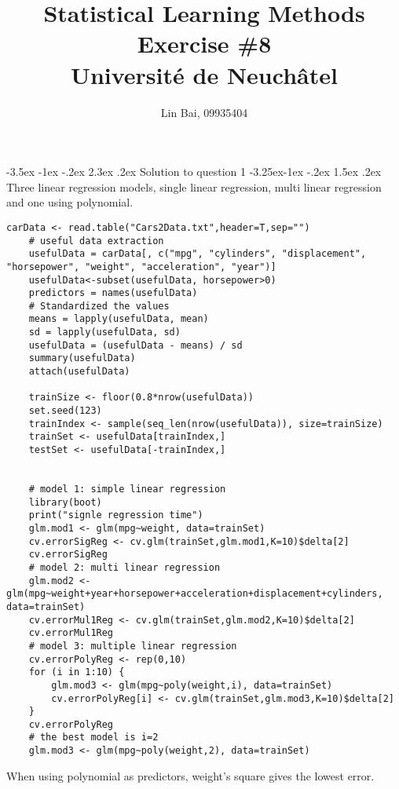 \documentclass[12pt]{article}
\makeatletter
\renewcommand\section{\@startsection {section}{1}{\z@}%
	{-3.5ex \@plus -1ex \@minus -.2ex}%
	{2.3ex \@plus.2ex}%
	{\normalfont\large\bfseries}}%
\renewcommand\subsection{\@startsection{subsection}{2}{\z@}%
	{-3.25ex\@plus -1ex \@minus -.2ex}%
	{1.5ex \@plus .2ex}%
	{\normalfont\large\bfseries}}%
\makeatother
\begin{document}
	
	
	
	\title{\textbf{Statistical Learning Methods Exercise \#{8}}\\
	Universit{\'e} de Neuch\^{a}tel}%
	\author{{Lin Bai, 09935404}} %
	
	\maketitle

	\section{Solution to question 1}
	\subsection{}
	Three linear regression models, single linear regression, multi linear regression and one using polynomial.\\
	\lstset{language=R}
	\lstset{frame=lines}
	\lstset{basicstyle=\footnotesize\ttfamily}
	\begin{lstlisting}[breaklines=true]
	carData <- read.table("Cars2Data.txt",header=T,sep="")
	# useful data extraction
	usefulData = carData[, c("mpg", "cylinders", "displacement", "horsepower", "weight", "acceleration", "year")]
	usefulData<-subset(usefulData, horsepower>0)
	predictors = names(usefulData)
	# Standardized the values
	means = lapply(usefulData, mean)
	sd = lapply(usefulData, sd)
	usefulData = (usefulData - means) / sd
	summary(usefulData)
	attach(usefulData)
	
	trainSize <- floor(0.8*nrow(usefulData))
	set.seed(123)
	trainIndex <- sample(seq_len(nrow(usefulData)), size=trainSize)
	trainSet <- usefulData[trainIndex,]
	testSet <- usefulData[-trainIndex,]
	
	
	# model 1: simple linear regression
	library(boot)
	print("signle regression time")
	glm.mod1 <- glm(mpg~weight, data=trainSet)
	cv.errorSigReg <- cv.glm(trainSet,glm.mod1,K=10)$delta[2]
	cv.errorSigReg
	# model 2: multi linear regression
	glm.mod2 <- glm(mpg~weight+year+horsepower+acceleration+displacement+cylinders, data=trainSet)
	cv.errorMul1Reg <- cv.glm(trainSet,glm.mod2,K=10)$delta[2]
	cv.errorMul1Reg
	# model 3: multiple linear regression
	cv.errorPolyReg <- rep(0,10)
	for (i in 1:10) {
		glm.mod3 <- glm(mpg~poly(weight,i), data=trainSet)
		cv.errorPolyReg[i] <- cv.glm(trainSet,glm.mod3,K=10)$delta[2]
	}
	cv.errorPolyReg
	# the best model is i=2
	glm.mod3 <- glm(mpg~poly(weight,2), data=trainSet)
	\end{lstlisting}
	When using polynomial as predictors, weight's square gives the lowest error.\\
\end{document}
